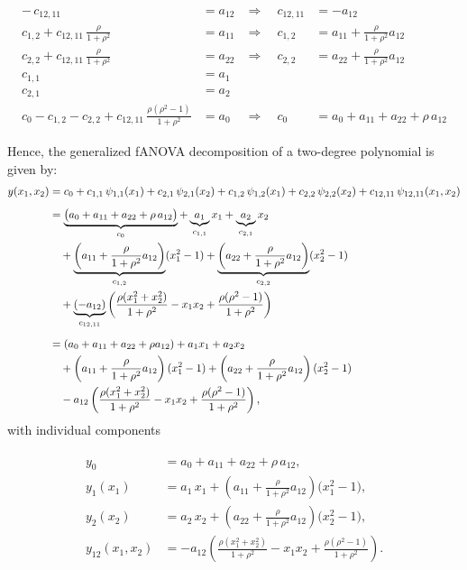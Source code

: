 \begin{align*}
-\,c_{12, 11} &= a_{12} &\Rightarrow\quad c_{12, 11} &= -a_{12} \\[3pt]
c_{1,2} + c_{12, 11}\,\tfrac{\rho}{1+\rho^2} &= a_{11} 
&\Rightarrow\quad c_{1,2} &= a_{11} + \tfrac{\rho}{1+\rho^2}a_{12} \\[3pt]
c_{2,2} + c_{12, 11}\,\tfrac{\rho}{1+\rho^2} &= a_{22} 
&\Rightarrow\quad c_{2,2} &= a_{22} + \tfrac{\rho}{1+\rho^2}a_{12} \\[3pt]
c_{1,1} &= a_1 \\[3pt]
c_{2,1} &= a_2 \\[3pt]
c_0 - c_{1,2} - c_{2,2} + c_{12, 11}\,\tfrac{\rho(\rho^2 - 1)}{1+\rho^2} &= a_0 
&\Rightarrow\quad 
c_0 &= a_0 + a_{11} + a_{22} + \rho\,a_{12}
\end{align*}

Hence, the generalized fANOVA decomposition of a two-degree polynomial is given by:
\begin{align*}
y(x_1,x_2) 
&= c_0 
  + c_{1,1}\,\psi_{1,1}(x_1) 
  + c_{2,1}\,\psi_{2,1}(x_2)
  + c_{1,2}\,\psi_{1,2}(x_1)
  + c_{2,2}\,\psi_{2,2}(x_2)
  + c_{12,11}\,\psi_{12,11}(x_1,x_2) \\[5pt]
&= 
\underbrace{\big(a_0 + a_{11} + a_{22} + \rho\,a_{12}\big)}_{c_0} 
+ \underbrace{a_1}_{c_{1,1}} x_1
+ \underbrace{a_2}_{c_{2,1}} x_2 \\ 
&\quad 
+ \underbrace{\left(a_{11} + \frac{\rho}{1+\rho^2}a_{12}\right)}_{c_{1,2}} (x_1^2 - 1)
+ \underbrace{\left(a_{22} + \frac{\rho}{1+\rho^2}a_{12}\right)}_{c_{2,2}} (x_2^2 - 1) \notag \\
&\quad 
+ \underbrace{(-a_{12})}_{c_{12, 11}}\left(
    \frac{\rho(x_1^2+x_2^2)}{1+\rho^2} - x_1 x_2 
    + \frac{\rho(\rho^2-1)}{1+\rho^2}
  \right) \\[5pt]
&= 
(a_0 + a_{11} + a_{22} + \rho a_{12})
+ a_1 x_1
+ a_2 x_2 \notag \\ 
&\quad 
+ \left(a_{11} + \frac{\rho}{1+\rho^2} a_{12}\right)(x_1^2 - 1)
+ \left(a_{22} + \frac{\rho}{1+\rho^2} a_{12}\right)(x_2^2 - 1) \notag \\
&\quad 
- a_{12}\left(
  \frac{\rho(x_1^2 + x_2^2)}{1+\rho^2}
  - x_1 x_2
  + \frac{\rho(\rho^2 - 1)}{1+\rho^2}
  \right),
\end{align*}
with individual components

\begin{align}
\begin{split}
y_0 &= a_0 + a_{11} + a_{22} + \rho\,a_{12}, \\[3pt]
y_1(x_1) &= a_1\,x_1 
  + \left(a_{11} + \frac{\rho}{1+\rho^2}a_{12}\right)\bigl(x_1^2 - 1\bigr), \\[3pt]
y_2(x_2) &= a_2\,x_2 
  + \left(a_{22} + \frac{\rho}{1+\rho^2}a_{12}\right)\bigl(x_2^2 - 1\bigr), \\[3pt]
y_{12}(x_1,x_2) 
&= -a_{12}\!\left(
    \frac{\rho(x_1^2+x_2^2)}{1+\rho^2} 
    - x_1 x_2 
    + \frac{\rho(\rho^2-1)}{1+\rho^2}
   \right).
\end{split}
\label{eq:fanova_components_2D_polynomial}
\end{align}



